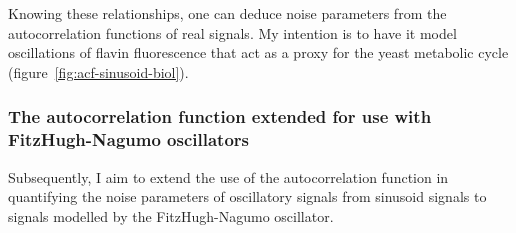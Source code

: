 Knowing these relationships, one can deduce noise parameters from the autocorrelation functions of real signals.
My intention is to have it model oscillations of flavin fluorescence that act as a proxy for the yeast metabolic cycle (figure~\ref{fig:acf-sinusoid-biol}).


\subsubsection{The autocorrelation function extended for use with FitzHugh-Nagumo oscillators}
\label{subsubsec:analysis-characterisation-acf-fhn}

Subsequently, I aim to extend the use of the autocorrelation function in quantifying the noise parameters of oscillatory signals from sinusoid signals to signals modelled by the FitzHugh-Nagumo oscillator.

